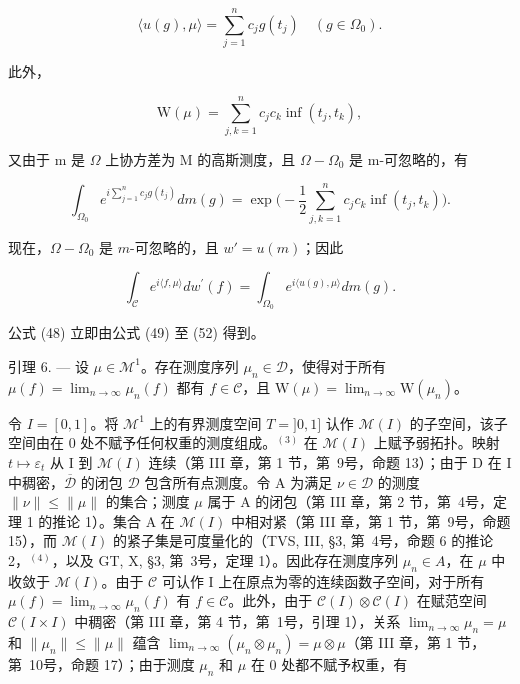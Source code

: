 \[
\langle u (g), \mu \rangle = \sum_ {j = 1} ^ {n} c _ {j} g (t _ {j}) \quad (g \in \Omega_ {0}).\tag{49}
\]

此外，

\[
\mathrm{W} (\mu) = \sum_ {j, k = 1} ^ {n} c _ {j} c _ {k} \inf (t _ {j}, t _ {k}),\tag{50}
\]

又由于 m 是 \(\Omega\) 上协方差为 M 的高斯测度，且 \(\Omega - \Omega_{0}\) 是 m-可忽略的，有

\[
\int_ {\Omega_ {0}} e ^ {i \sum_ {j = 1} ^ {n} c _ {j} g (t _ {j})} d m (g) = \exp \Big (- \frac {1}{2} \sum_ {j, k = 1} ^ {n} c _ {j} c _ {k} \inf (t _ {j}, t _ {k}) \Big).\tag{51}
\]

现在，\(\Omega - \Omega_0\) 是 \(m\)-可忽略的，且 \(w' = u(m)\)；因此

\[
\int_ {\mathcal {C}} e ^ {i \langle f, \mu \rangle} d w ^ {\prime} (f) = \int_ {\Omega_ {0}} e ^ {i \langle u (g), \mu \rangle} d m (g).\tag{52}
\]

公式 (48) 立即由公式 (49) 至 (52) 得到。

引理 6. --- 设 \(\mu \in \mathcal{M}^1\)。存在测度序列 \(\mu_n \in \mathcal{D}\)，使得对于所有 \(\mu(f) = \lim_{n \to \infty} \mu_n(f)\) 都有 \(f \in \mathcal{C}\)，且 \(\mathrm{W}(\mu) = \lim_{n \to \infty} \mathrm{W}(\mu_n)\)。

令 \(I = [0,1]\)。将 \(\mathcal{M}^1\) 上的有界测度空间 \(T = ]0,1]\) 认作 \(\mathcal{M}(I)\) 的子空间，该子空间由在 0 处不赋予任何权重的测度组成。\(^{(3)}\) 在 \(\mathcal{M}(I)\) 上赋予弱拓扑。映射 \(t \mapsto \varepsilon_t\) 从 I 到 \(\mathcal{M}(I)\) 连续（第 III 章，第 1 节，第~9号，命题 13）；由于 D 在 I 中稠密，\(\overline{\mathcal{D}}\) 的闭包 \(\mathcal{D}\) 包含所有点测度。令 A 为满足 \(\nu \in \mathcal{D}\) 的测度 \(\| \nu \| \leqslant \| \mu \|\) 的集合；测度 \(\mu\) 属于 A 的闭包（第 III 章，第 2 节，第~4号，定理 1 的推论 1）。集合 A 在 \(\mathcal{M}(I)\) 中相对紧（第 III 章，第 1 节，第~9号，命题 15），而 \(\mathcal{M}(I)\) 的紧子集是可度量化的（TVS, III, §3, 第~4号，命题 6 的推论 2，\(^{(4)}\)，以及 GT, X, §3, 第~3号，定理 1）。因此存在测度序列 \(\mu_n \in A\)，在 \(\mu\) 中收敛于 \(\mathcal{M}(I)\)。由于 \(\mathcal{C}\) 可认作 I 上在原点为零的连续函数子空间，对于所有 \(\mu(f) = \lim_{n \to \infty} \mu_n(f)\) 有 \(f \in \mathcal{C}\)。此外，由于 \(\mathcal{C}(I) \otimes \mathcal{C}(I)\) 在赋范空间 \(\mathcal{C}(I \times I)\) 中稠密（第 III 章，第 4 节，第~1号，引理 1），关系 \(\lim_{n \to \infty} \mu_n = \mu\) 和 \(\| \mu_n \| \leqslant \| \mu \|\) 蕴含 \(\lim_{n \to \infty} (\mu_n \otimes \mu_n) = \mu \otimes \mu\)（第 III 章，第 1 节，第~10号，命题 17）；由于测度 \(\mu_n\) 和 \(\mu\) 在 0 处都不赋予权重，有

